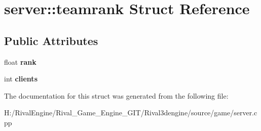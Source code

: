 \hypertarget{structserver_1_1teamrank}{}\section{server\+:\+:teamrank Struct Reference}
\label{structserver_1_1teamrank}
\subsection*{Public Attributes}
\begin{DoxyCompactItemize}
\item 
\mbox{\label{structserver_1_1teamrank_a55b4dbf7fd929582fd167f724ffc8b88}} 
float {\bfseries rank}
\item 
\mbox{\label{structserver_1_1teamrank_a0e396d2e56cbf70194a7ddb76c32aa50}} 
int {\bfseries clients}
\end{DoxyCompactItemize}


The documentation for this struct was generated from the following file\+:\begin{DoxyCompactItemize}
\item 
H\+:/\+Rival\+Engine/\+Rival\+\_\+\+Game\+\_\+\+Engine\+\_\+\+G\+I\+T/\+Rival3dengine/source/game/server.\+cpp\end{DoxyCompactItemize}
